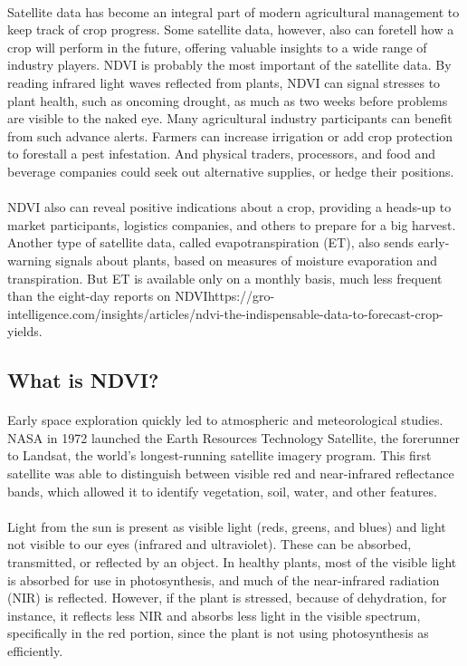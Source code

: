 \documentclass[12pt, a4paper]{report}
\begin{document}
\paragraph{}
Satellite data has become an integral part of modern agricultural management to keep track of crop progress. Some satellite data, however, also can foretell how a crop will perform in the future, offering valuable insights to a wide range of industry players.
NDVI is probably the most important of the satellite data. By reading infrared light waves reflected from plants, NDVI can signal stresses to plant health, such as oncoming drought, as much as two weeks before problems are visible to the naked eye. Many agricultural industry participants can benefit from such advance alerts. Farmers can increase irrigation or add crop protection to forestall a pest infestation. And physical traders, processors, and food and beverage companies could seek out alternative supplies, or hedge their positions.\cite{ndvione}
\paragraph{}
NDVI also can reveal positive indications about a crop, providing a heads-up to market participants, logistics companies, and others to prepare for a big harvest. Another type of satellite data, called evapotranspiration (ET), also sends early-warning signals about plants, based on measures of moisture evaporation and transpiration. But ET is available only on a monthly basis, much less frequent than the eight-day reports on NDVIhttps://gro-intelligence.com/insights/articles/ndvi-the-indispensable-data-to-forecast-crop-yields.\cite{ndvione}
\subsection{What is NDVI?}
\paragraph{}
Early space exploration quickly led to atmospheric and meteorological studies. NASA in 1972 launched the Earth Resources Technology Satellite, the forerunner to Landsat, the world’s longest-running satellite imagery program. This first satellite was able to distinguish between visible red and near-infrared reflectance bands, which allowed it to identify vegetation, soil, water, and other features.\cite{ndvione}
\paragraph{}
Light from the sun is present as visible light (reds, greens, and blues) and light not visible to our eyes (infrared and ultraviolet). These can be absorbed, transmitted, or reflected by an object. In healthy plants, most of the visible light is absorbed for use in photosynthesis, and much of the near-infrared radiation (NIR) is reflected. However, if the plant is stressed, because of dehydration, for instance, it reflects less NIR and absorbs less light in the visible spectrum, specifically in the red portion, since the plant is not using photosynthesis as efficiently.\cite{ndvione}
\end{document}
